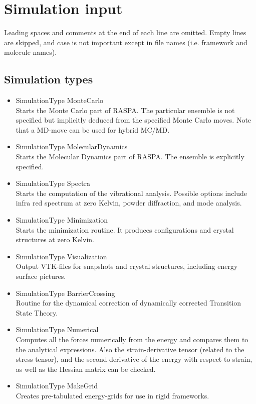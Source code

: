 \section{Simulation input}

Leading spaces and comments at the end of each line are omitted. Empty lines are skipped, 
and case is not important except in file names (i.e. framework and molecule names).

\subsection*{Simulation types}
\begin{itemize}
\item{SimulationType MonteCarlo}\\
Starts the Monte Carlo part of RASPA. The particular ensemble is not specified but implicitly deduced from
the specified Monte Carlo moves. Note that a MD-move can be used for hybrid MC/MD.
\item{SimulationType MolecularDynamics}\\
Starts the Molecular Dynamics part of RASPA. The ensemble is explicitly specified.
\item{SimulationType Spectra}\\
Starts the computation of the vibrational analysis. Possible options include infra red spectrum at zero Kelvin,
powder diffraction, and mode analysis.
\item{SimulationType Minimization}\\
Starts the minimization routine. It produces configurations and crystal structures at zero Kelvin.
\item{SimulationType Visualization}\\
Output VTK-files for snapshots and crystal structures, including energy surface pictures.
\item{SimulationType BarrierCrossing}\\
Routine for the dynamical correction of dynamically corrected Transition State Theory.
\item{SimulationType Numerical}\\
Computes all the forces numerically from the energy and compares them to the analytical expressions.
Also the strain-derivative tensor (related to the stress tensor), and the second derivative of
the energy with respect to strain, as well as the Hessian matrix can be checked.
\item{SimulationType MakeGrid}\\
Creates pre-tabulated energy-grids for use in rigid frameworks.
\end{itemize}

